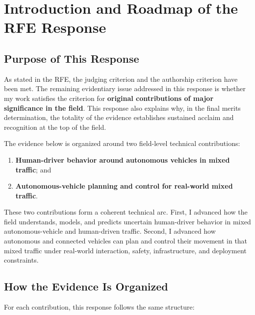 \documentclass[11pt,letterpaper]{article}
\begin{document}
\newpage
\tableofcontents
\newpage

\section{Introduction and Roadmap of the RFE Response}

\subsection{Purpose of This Response}

As stated in the RFE, the judging criterion and the authorship criterion have been met. The remaining evidentiary issue addressed in this response is whether my work satisfies the criterion for \textbf{original contributions of major significance in the field}. This response also explains why, in the final merits determination, the totality of the evidence establishes sustained acclaim and recognition at the top of the field.

The evidence below is organized around two field-level technical contributions:

\begin{enumerate}
\item \textbf{Human-driver behavior around autonomous vehicles in mixed traffic}; and
\item \textbf{Autonomous-vehicle planning and control for real-world mixed traffic}.
\end{enumerate}

These two contributions form a coherent technical arc. First, I advanced how the field understands, models, and predicts uncertain human-driver behavior in mixed autonomous-vehicle and human-driven traffic. Second, I advanced how autonomous and connected vehicles can plan and control their movement in that mixed traffic under real-world interaction, safety, infrastructure, and deployment constraints.

\subsection{How the Evidence Is Organized}

For each contribution, this response follows the same structure:
\end{document}
